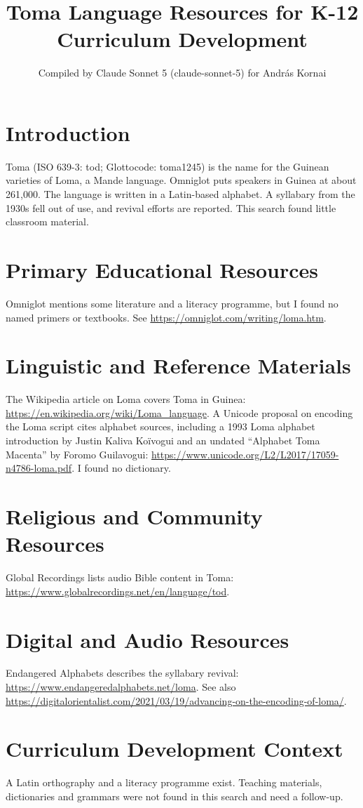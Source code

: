 \documentclass[12pt]{article}
\title{Toma Language Resources for K-12 Curriculum Development}
\author{Compiled by Claude Sonnet 5 (claude-sonnet-5) for Andr\'as Kornai}
\date{}
\begin{document}
\maketitle

\section{Introduction}
Toma (ISO 639-3: tod; Glottocode: toma1245) is the name for the Guinean varieties of Loma, a Mande language. Omniglot puts speakers in Guinea at about 261,000. The language is written in a Latin-based alphabet. A syllabary from the 1930s fell out of use, and revival efforts are reported. This search found little classroom material.

\section{Primary Educational Resources}
Omniglot mentions some literature and a literacy programme, but I found no named primers or textbooks. See \url{https://omniglot.com/writing/loma.htm}.

\section{Linguistic and Reference Materials}
The Wikipedia article on Loma covers Toma in Guinea: \url{https://en.wikipedia.org/wiki/Loma_language}. A Unicode proposal on encoding the Loma script cites alphabet sources, including a 1993 Loma alphabet introduction by Justin Kaliva Koïvogui and an undated ``Alphabet Toma Macenta'' by Foromo Guilavogui: \url{https://www.unicode.org/L2/L2017/17059-n4786-loma.pdf}. I found no dictionary.

\section{Religious and Community Resources}
Global Recordings lists audio Bible content in Toma: \url{https://www.globalrecordings.net/en/language/tod}.

\section{Digital and Audio Resources}
Endangered Alphabets describes the syllabary revival: \url{https://www.endangeredalphabets.net/loma}. See also \url{https://digitalorientalist.com/2021/03/19/advancing-on-the-encoding-of-loma/}.

\section{Curriculum Development Context}
A Latin orthography and a literacy programme exist. Teaching materials, dictionaries and grammars were not found in this search and need a follow-up.
\end{document}
